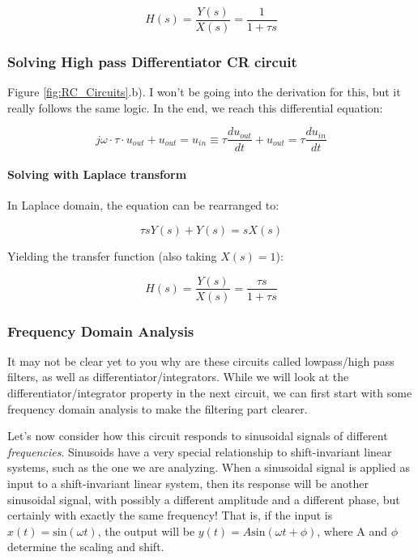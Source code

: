 \begin{equation}
    H(s) = \frac{Y(s)}{X(s)} = \frac{1}{1 + \tau s}
\end{equation}


\subsubsection{Solving High pass Differentiator CR circuit} 

Figure \ref{fig:RC_Circuits}.b). I won't be going into the derivation for this, but it really follows the same logic. In the end, we reach this differential equation: 

\begin{equation}
    j \omega \cdot \tau \cdot u_{out} + u_{out} = u_{in} \equiv \tau \frac{du_{out}}{dt} + u_{out} = \tau\frac{d u_{in}}{dt}
\end{equation}

\paragraph{Solving with Laplace transform}

In Laplace domain, the equation can be rearranged to: 

\begin{equation}
    \tau s Y(s) + Y(s) = sX(s)
\end{equation}

Yielding the transfer function (also taking $X(s) = 1$): 

\begin{equation}
    H(s) = \frac{Y(s)}{X(s)} = \frac{\tau s}{1 + \tau s }
\end{equation}

\subsubsection{Frequency Domain Analysis}

It may not be clear yet to you why are these circuits called lowpass/high pass filters, as well as differentiator/integrators. While we will look at the differentiator/integrator property in the next circuit, we can first start with some frequency domain analysis to make the filtering part clearer. 

Let's now consider how this circuit responds to sinusoidal signals of different \textit{frequencies}. Sinusoids have a very special relationship to shift-invariant linear systems, such as the one we are analyzing. When a sinusoidal signal is applied as input to a shift-invariant linear system, then its response will be another sinusoidal signal, with possibly a different amplitude and a different phase, but certainly with exactly the same frequency! That is, if the input is $x(t) = \mathrm{sin}(\omega t)$, the output will be $y(t) = A \mathrm{sin}(\omega t + \phi)$, where A and $\phi$ determine the scaling and shift.

